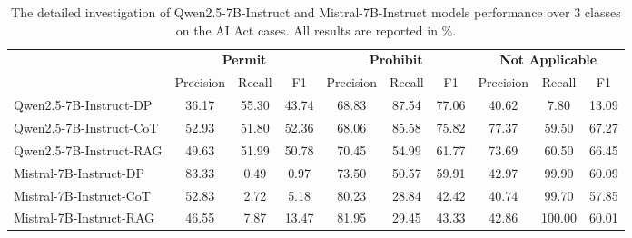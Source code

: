\begin{table*}[t]
    \centering
    \small
    \setlength{\tabcolsep}{5pt}
    \begin{tabular}{l|ccc|ccc|ccc}
        \toprule
        \multirow{2}{*}{} 
         & \multicolumn{3}{c|}{\textbf{Permit}} & \multicolumn{3}{c|}{\textbf{Prohibit}} & \multicolumn{3}{c}{\textbf{Not Applicable}} \\
        \textbf{Model\&Method} & Precision & Recall & F1 & Precision & Recall & F1 & Precision & Recall & F1 \\
        \midrule
        Qwen2.5-7B-Instruct-DP & 36.17  &  55.30  &  43.74 & 68.83  &  87.54  &  77.06 & 40.62   & 7.80  &  13.09 \\
        Qwen2.5-7B-Instruct-CoT & 52.93    &51.80    &52.36 &68.06  &  85.58   & 75.82  & 77.37   & 59.50    &67.27  \\
        Qwen2.5-7B-Instruct-RAG & 49.63  &  51.99  &  50.78  &  70.45  &  54.99  &  61.77 & 73.69  &  60.50  &  66.45  \\
        Mistral-7B-Instruct-DP & 83.33  &  0.49  &  0.97 & 73.50  & 50.57  &  59.91 & 42.97  &  99.90  &  60.09  \\
        Mistral-7B-Instruct-CoT & 52.83  &  2.72  &  5.18  & 80.23   &  28.84   & 42.42  &  40.74   &  99.70   &  57.85  \\
        Mistral-7B-Instruct-RAG & 46.55  &  7.87  &  13.47 &  81.95  &  29.45  &  43.33  &  42.86   & 100.00  &  60.01  \\
        
        \bottomrule
    \end{tabular}
    \vspace{-0.1in}
    \caption{The detailed investigation of Qwen2.5-7B-Instruct and Mistral-7B-Instruct models performance over 3 classes on the AI Act cases. All results are reported in \%.}
    \label{tab:compliance_detail}
    \vspace{-0.2in}
\end{table*}